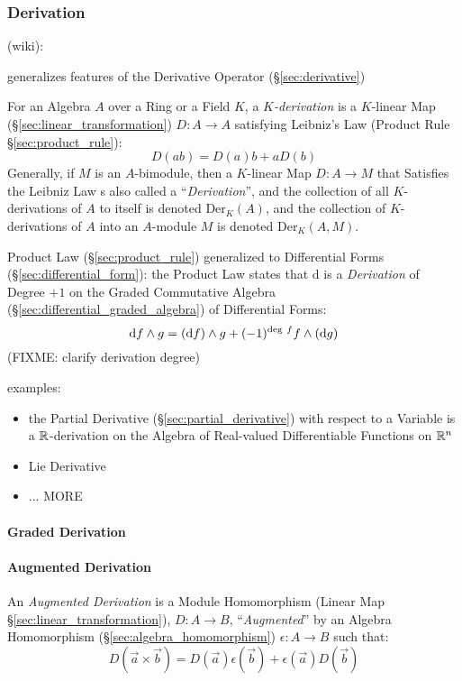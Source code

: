 \subsubsection{Derivation}\label{sec:derivation}

(wiki):

generalizes features of the Derivative Operator (\S\ref{sec:derivative})

For an Algebra $A$ over a Ring or a Field $K$, a \emph{$K$-derivation} is a
$K$-linear Map (\S\ref{sec:linear_transformation}) $D : A \rightarrow A$
satisfying Leibniz's Law (Product Rule \S\ref{sec:product_rule}):
\[
  D(ab) = D(a)b + aD(b)
\]
Generally, if $M$ is an $A$-bimodule, then a $K$-linear Map $D : A \rightarrow
M$ that Satisfies the Leibniz Law s also called a ``\emph{Derivation}'', and the
collection of all $K$-derivations of $A$ to itself is denoted
$\mathrm{Der}_K(A)$, and the collection of $K$-derivations of $A$ into an
$A$-module $M$ is denoted $\mathrm{Der}_K(A, M)$.

Product Law (\S\ref{sec:product_rule}) generalized to Differential Forms
(\S\ref{sec:differential_form}): the Product Law states that $\mathrm{d}$ is a
\emph{Derivation} of Degree $+1$ on the Graded Commutative Algebra
(\S\ref{sec:differential_graded_algebra}) of Differential Forms:
\[
\mathrm{d}f \wedge g = (\mathrm{d}f) \wedge g +
  (-1)^{\mathrm{deg}\ f}f \wedge (\mathrm{d}g)
\]
(FIXME: clarify derivation degree)

examples:
\begin{itemize}
  \item the Partial Derivative (\S\ref{sec:partial_derivative}) with respect to
    a Variable is a $\mathbb{R}$-derivation on the Algebra of Real-valued
    Differentiable Functions on $\mathbb{R}^n$
  \item Lie Derivative
  \item ... MORE
\end{itemize}



\paragraph{Graded Derivation}\label{sec:graded_derivation}\hfill

\paragraph{Augmented Derivation}\label{sec:augmented_derivation}\hfill

An \emph{Augmented Derivation} is a Module Homomorphism (Linear Map
\S\ref{sec:linear_transformation}), $D : A \rightarrow B$, ``\emph{Augmented}''
by an Algebra Homomorphism (\S\ref{sec:algebra_homomorphism})
$\epsilon : A \rightarrow B$ such that:
\[
  D(\vec{a} \times \vec{b}) =
  D(\vec{a})\epsilon(\vec{b}) + \epsilon(\vec{a})D(\vec{b})
\]

